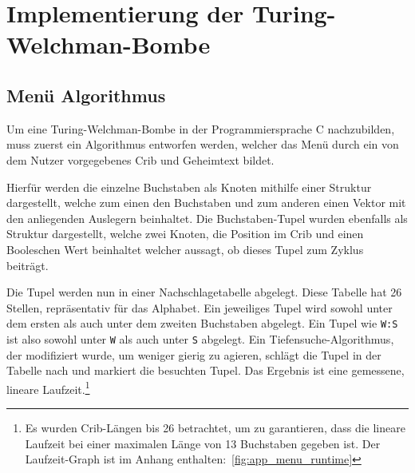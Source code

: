 \chapter{Implementierung der Turing-Welchman-Bombe}\label{ch:impl_bombe}


\section{Menü Algorithmus}\label{sec:cycle-finding-algorithm}
Um eine Turing-Welchman-Bombe in der Programmiersprache C nachzubilden, muss zuerst ein Algorithmus entworfen werden, welcher das Menü durch ein von dem Nutzer vorgegebenes Crib und 
Geheimtext bildet.

Hierfür werden die einzelne Buchstaben als Knoten mithilfe einer Struktur dargestellt, welche zum einen den Buchstaben und zum anderen einen Vektor mit den anliegenden Auslegern beinhaltet. 
Die Buchstaben-Tupel wurden ebenfalls als Struktur dargestellt, welche zwei Knoten, die Position im Crib und einen Booleschen Wert beinhaltet welcher aussagt, ob dieses Tupel zum Zyklus beiträgt.


\noindent

Die Tupel werden nun in einer \glqq Nachschlagetabelle\grqq{} abgelegt.
Diese Tabelle hat 26 Stellen, repräsentativ für das Alphabet.
Ein jeweiliges Tupel wird sowohl unter dem ersten als auch unter dem zweiten Buchstaben abgelegt. 
Ein Tupel wie \texttt{W:S} ist also sowohl unter \texttt{W} als auch unter \texttt{S} abgelegt.
Ein Tiefensuche-Algorithmus, der modifiziert wurde, um weniger \glqq gierig\grqq{} zu agieren, schlägt die Tupel in der Tabelle nach und markiert die besuchten Tupel.
Das Ergebnis ist eine gemessene, lineare Laufzeit.\footnote{Es wurden Crib-Längen bis 26 betrachtet, um zu garantieren, dass die lineare Laufzeit bei einer maximalen Länge von 13 Buchstaben gegeben ist.
Der Laufzeit-Graph ist im Anhang enthalten:~\cref{fig:app_menu_runtime}}

